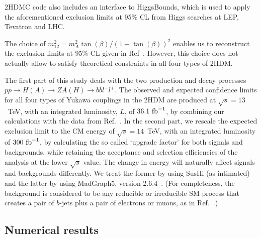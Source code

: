 2HDMC code also includes an interface to HiggsBounds, which is used to apply the aforementioned exclusion limits at 95\% CL from Higgs searches at LEP, Tevatron and LHC.

The choice of \(m^2_{12} = m_A^2 \tan(\beta) / (1 + \tan(\beta))^2\) enables us to reconstruct the exclusion limits at 95\%  CL given in Ref~\cite{Aaboud2018AZHbbll}.
However, this choice does not actually allow to satisfy theoretical constraints in all four types of 2HDM.

The first part of this study deals with the two production and decay processes \(pp \rightarrow H(A) \rightarrow ZA(H)\rightarrow b\overline{b}l^{-}l^{+}\).
The observed and expected confidence limits for all four types of Yukawa couplings in the 2HDM are produced at \(\sqrt{s}=13\)~TeV, with an integrated luminosity, $L$, of \(36.1~{\rm fb}^{-1}\),
by combining our calculations with the data from Ref.~\cite{Aaboud2018AZHbbll}. 
In the second part, we rescale the expected exclusion limit to the CM energy of \(\sqrt{s}=14\)~TeV,
with an integrated luminosity of \(300~{\rm fb}^{-1}\), by calculating the so called `upgrade factor' for both signals and backgrounds, while retaining the acceptance and selection efficiencies of the analysis at the lower $\sqrt s$ value. The change in energy will naturally affect signals and backgrounds differently. We treat the former by using SusHi (as intimated) and the latter by  using {MadGraph5, version 2.6.4}~\cite{alwall_madgraph2011}. (For completeness, the
 background is considered to be any reducible or irreducible SM process that creates a pair of $b$-jets plus a pair of electrons or muons, as in Ref.~\cite{Aaboud2018AZHbbll}.)

\subsection{Numerical results}


